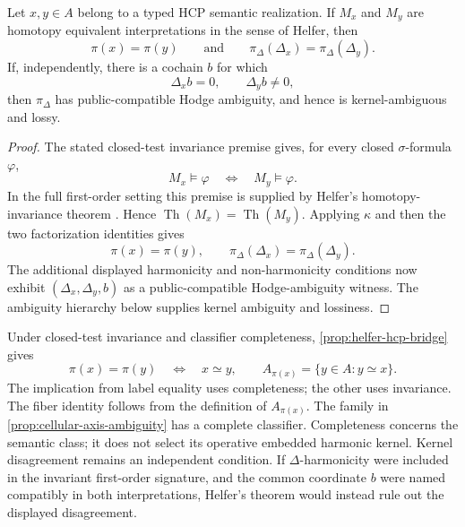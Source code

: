 \begin{proposition}\label{prop:helfer-hcp-bridge}
  Let \(x,y\in A\) belong to a typed HCP semantic realization. If
  \(M_x\) and \(M_y\) are homotopy equivalent interpretations in the sense of
  Helfer, then
  \[
    \pi(x)=\pi(y)
    \qquad\text{and}\qquad
    \pi_\Delta(\Delta_x)=\pi_\Delta(\Delta_y).
  \]
  If, independently, there is a cochain \(b\) for which
  \[
    \Delta_xb=0,
    \qquad
    \Delta_yb\ne0,
  \]
  then \(\pi_\Delta\) has public-compatible Hodge ambiguity, and hence is
  kernel-ambiguous and lossy.
\end{proposition}

\begin{proof}
  The stated closed-test invariance premise gives, for every closed
  \(\sigma\)-formula \(\varphi\),
  \[
    M_x\vDash\varphi
    \quad\Longleftrightarrow\quad
    M_y\vDash\varphi.
  \]
  In the full first-order setting this premise is supplied by Helfer's
  homotopy-invariance theorem \cite[Theorem~12.3]{helfer2019fol}.
  Hence \(\operatorname{Th}(M_x)=\operatorname{Th}(M_y)\). Applying
  \(\kappa\) and then the two factorization identities gives
  \[
    \pi(x)=\pi(y),
    \qquad
    \pi_\Delta(\Delta_x)=\pi_\Delta(\Delta_y).
  \]
  The additional displayed harmonicity and non-harmonicity conditions now
  exhibit \((\Delta_x,\Delta_y,b)\) as a public-compatible Hodge-ambiguity
  witness. The ambiguity hierarchy below supplies kernel ambiguity and
  lossiness.
\end{proof}

Under closed-test invariance and classifier completeness,
\cref{prop:helfer-hcp-bridge} gives
\[
  \pi(x)=\pi(y)\quad\Longleftrightarrow\quad x\simeq y,
  \qquad
  A_{\pi(x)}=\{y\in A:y\simeq x\}.
\]
The implication from label equality uses completeness; the other uses
invariance. The fiber identity follows from the definition of \(A_{\pi(x)}\).
The family in \cref{prop:cellular-axis-ambiguity} has a complete classifier.
Completeness concerns the semantic class; it does not select its operative
embedded harmonic kernel. Kernel disagreement remains an independent condition. If
\(\Delta\)-harmonicity were included in the invariant first-order signature,
and the common coordinate \(b\) were
named compatibly in both interpretations, Helfer's theorem would instead rule
out the displayed disagreement.

